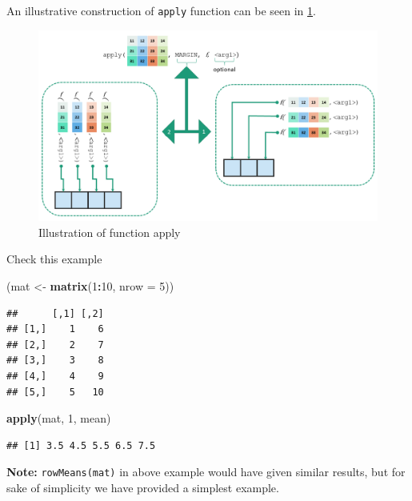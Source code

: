 \documentclass[
]{book}
\newenvironment{Shaded}{\begin{snugshade}}{\end{snugshade}}
\newcommand{\AttributeTok}[1]{\textcolor[rgb]{0.13,0.29,0.53}{#1}}
\newcommand{\DecValTok}[1]{\textcolor[rgb]{0.00,0.00,0.81}{#1}}
\newcommand{\FunctionTok}[1]{\textcolor[rgb]{0.13,0.29,0.53}{\textbf{#1}}}
\newcommand{\NormalTok}[1]{#1}
\newcommand{\OtherTok}[1]{\textcolor[rgb]{0.56,0.35,0.01}{#1}}
\newcommand{\SpecialCharTok}[1]{\textcolor[rgb]{0.81,0.36,0.00}{\textbf{#1}}}
\begin{document}
An illustrative construction of \texttt{apply} function can be seen in \ref{fig:applyimage}.

\begin{figure}

{\centering \includegraphics[width=1\linewidth]{images/apply} 

}

\caption{Illustration of function apply}\label{fig:applyimage}
\end{figure}

Check this example

\begin{Shaded}
\begin{Highlighting}[]
\NormalTok{(mat }\OtherTok{\textless{}{-}} \FunctionTok{matrix}\NormalTok{(}\DecValTok{1}\SpecialCharTok{:}\DecValTok{10}\NormalTok{, }\AttributeTok{nrow =} \DecValTok{5}\NormalTok{))}
\end{Highlighting}
\end{Shaded}

\begin{verbatim}
##      [,1] [,2]
## [1,]    1    6
## [2,]    2    7
## [3,]    3    8
## [4,]    4    9
## [5,]    5   10
\end{verbatim}

\begin{Shaded}
\begin{Highlighting}[]
\FunctionTok{apply}\NormalTok{(mat, }\DecValTok{1}\NormalTok{, mean)}
\end{Highlighting}
\end{Shaded}

\begin{verbatim}
## [1] 3.5 4.5 5.5 6.5 7.5
\end{verbatim}

\textbf{Note:} \texttt{rowMeans(mat)} in above example would have given similar results, but for sake of simplicity we have provided a simplest example.
\end{document}
